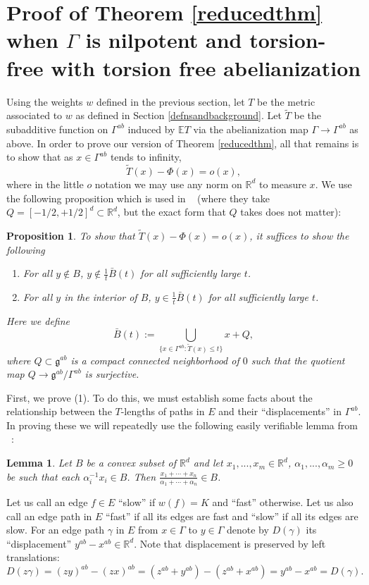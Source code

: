 \documentclass[12pt,reqno]{article}
\numberwithin{equation}{section}
\newcommand{\R}{\mathbb{R}}
\newcommand{\E}{\mathbb{E}}
\newcommand{\g}{\mathfrak{g}}
\newtheorem{lemma}{Lemma}
\newtheorem{prop}{Proposition}
\begin{document}
\section{Proof of Theorem \ref{reducedthm} when $\Gamma$ is nilpotent and torsion-free with torsion free abelianization}
Using the weights $w$ defined in the previous section, let $T$ be the metric associated to $w$ as defined in Section \ref{defnsandbackground}.
Let $\tilde{T}$ be the subadditive function on $\Gamma^{ab}$ induced by $\E T$ via the abelianization map $\Gamma \to \Gamma^{ab}$
as above. In order to prove our version of Theorem \ref{reducedthm}, all that remains is to show that
as $x \in \Gamma^{ab}$ tends to infinity,
\[ \tilde{T}(x) - \Phi (x) = o(x), \]
where in the little $o$ notation we may use any norm on $\R^d$ to measure $x$.
We use the following proposition which is used in ~\cite{HaggstromMeester} (where they take $Q=[-1/2,+1/2]^d \subset \R^d$,
but the exact form that $Q$ takes does not matter):
\begin{prop} \label{normreductionprop}
To show that $\tilde{T}(x) - \Phi(x) = o(x)$, it suffices to show the following
\begin{enumerate}
\item For all $y \notin B$, $y \notin \frac{1}{t}\bar{B}(t)$ for all sufficiently large $t$. 
\item For all $y$ in the interior of $B$, $y \in \frac{1}{t}\bar{B}(t)$ for all sufficiently large $t$. 
\end{enumerate}
Here we define 
\[ \bar{B}(t) := \bigcup_{\{x \in \Gamma^{ab} : \tilde{T}(x) \le t \}} x + Q, \]
where $Q \subset \g^{ab}$ is a compact connected neighborhood of $0$ such that the quotient map $Q \to \g^{ab}/\Gamma^{ab}$
is surjective.
\end{prop}

First, we prove (1). 
To do this, we must establish some facts about the relationship
between the $T$-lengths of paths in $E$ and their ``displacements'' in $\Gamma^{ab}$.
In proving these we will repeatedly use the following easily
verifiable lemma from ~\cite{HaggstromMeester}:
\begin{lemma} \label{convexlemma}
   Let $B$ be a convex subset of $\R^d$ and let $x_1,...,x_m \in \R^d$, $\alpha_1,...,\alpha_m \ge 0$ be such that
   each $\alpha_i^{-1} x_i \in B$. Then $\frac{x_1 + \cdots + x_n}{\alpha_1 + \cdots + \alpha_n} \in B$.
\end{lemma}

Let us call an edge $f \in E$ ``slow'' if $w(f) = K$ and ``fast'' otherwise. Let us also call an edge path in $E$ ``fast'' if all its edges are fast
and ``slow'' if all its edges are slow. For an edge path $\gamma$ in $E$ from $x \in \Gamma$ to $y \in \Gamma$ denote by $D(\gamma)$
its ``displacement'' $y^{ab} - x^{ab} \in \R^d$. Note that displacement is preserved by left translations:
\[ D(z\gamma) = (zy)^{ab} - (zx)^{ab} = (z^{ab} + y^{ab}) - (z^{ab} + x^{ab}) = y^{ab} - x^{ab} = D(\gamma). \] 
\end{document}
